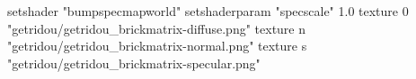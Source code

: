 setshader "bumpspecmapworld"
setshaderparam "specscale" 1.0
texture 0 "getridou/getridou_brickmatrix-diffuse.png"
texture n "getridou/getridou_brickmatrix-normal.png"
texture s "getridou/getridou_brickmatrix-specular.png"